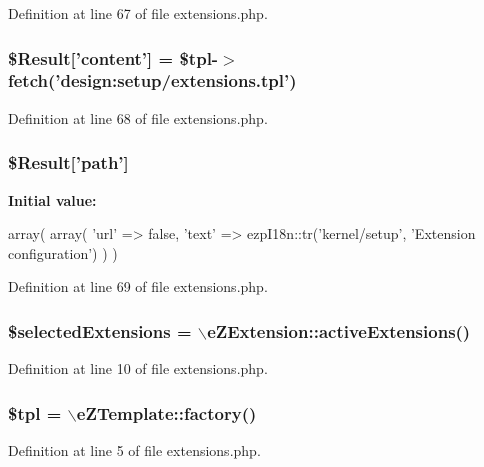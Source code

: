 \-Definition at line 67 of file extensions.\-php.

\hypertarget{extensions_8php_a0d32c70e3cf8c7b3fe5e4a499e9cd58f}{
\subsubsection[{\$\-Result}]{\setlength{\rightskip}{0pt plus 5cm}\$\-Result\mbox{[}'content'\mbox{]} = \$tpl-\/$>$fetch('design\-:setup/extensions.\-tpl')}}\label{extensions_8php_a0d32c70e3cf8c7b3fe5e4a499e9cd58f}


\-Definition at line 68 of file extensions.\-php.

\hypertarget{extensions_8php_a94a2cc5784adee982dec0235638f6251}{
\subsubsection[{\$\-Result}]{\setlength{\rightskip}{0pt plus 5cm}\$\-Result\mbox{[}'path'\mbox{]}}}\label{extensions_8php_a94a2cc5784adee982dec0235638f6251}
{\bfseries \-Initial value\-:}
\begin{DoxyCode}
 array(
                        array(
                            'url' => false,
                            'text' => ezpI18n::tr('kernel/setup', 'Extension
       configuration')
                        )
                )
\end{DoxyCode}


\-Definition at line 69 of file extensions.\-php.

\hypertarget{extensions_8php_adb784a735925c0ca3b600a1e0b1df50e}{
\subsubsection[{\$selected\-Extensions}]{\setlength{\rightskip}{0pt plus 5cm}\$selected\-Extensions = $\backslash$e\-Z\-Extension\-::active\-Extensions()}}\label{extensions_8php_adb784a735925c0ca3b600a1e0b1df50e}


\-Definition at line 10 of file extensions.\-php.

\hypertarget{extensions_8php_a04b1944cdb09f9a4e290cde7a12499e6}{
\subsubsection[{\$tpl}]{\setlength{\rightskip}{0pt plus 5cm}\$tpl = $\backslash$e\-Z\-Template\-::factory()}}\label{extensions_8php_a04b1944cdb09f9a4e290cde7a12499e6}


\-Definition at line 5 of file extensions.\-php.

